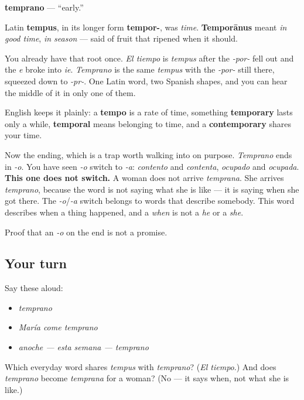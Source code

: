 \begin{cousinweb}
\textbf{temprano} — \textquotedblleft{}early.\textquotedblright{}

Latin \textbf{tempus}, in its longer form \textbf{tempor-}, was \emph{time}. \textbf{Temporānus} meant \emph{in good time}, \emph{in season} — said of fruit that ripened when it should.

You already have that root once. \emph{El tiempo} is \emph{tempus} after the \emph{-por-} fell out and the \emph{e} broke into \emph{ie}. \emph{Temprano} is the same \emph{tempus} with the \emph{-por-} still there, squeezed down to \emph{-pr-}. One Latin word, two Spanish shapes, and you can hear the middle of it in only one of them.

English keeps it plainly: a \textbf{tempo} is a rate of time, something \textbf{temporary} lasts only a while, \textbf{temporal} means belonging to time, and a \textbf{contemporary} shares your time.

Now the ending, which is a trap worth walking into on purpose. \emph{Temprano} ends in \emph{-o}. You have seen \emph{-o} switch to \emph{-a}: \emph{contento} and \emph{contenta}, \emph{ocupado} and \emph{ocupada}. \textbf{This one does not switch.} A woman does not arrive \emph{temprana}. She arrives \emph{temprano}, because the word is not saying what she is like — it is saying when she got there. The \emph{-o}/\emph{-a} switch belongs to words that describe somebody. This word describes when a thing happened, and a \emph{when} is not a \emph{he} or a \emph{she}.
\end{cousinweb}

\begin{grammarlens}[title={What you've built}]
Proof that an \emph{-o} on the end is not a promise.
\end{grammarlens}

\subsection*{Your turn}
Say these aloud:

\begin{itemize}
\raggedright
  \item \emph{temprano}
  \item \emph{María come temprano}
  \item \emph{anoche — esta semana — temprano}
\end{itemize}

\begin{tcolorbox}[breakable,colback=teal!4,colframe=teal!35!black,title={Before you move on}]
Which everyday word shares \emph{tempus} with \emph{temprano}? (\emph{El tiempo}.) And does \emph{temprano} become \emph{temprana} for a woman? (No — it says when, not what she is like.)
\end{tcolorbox}

